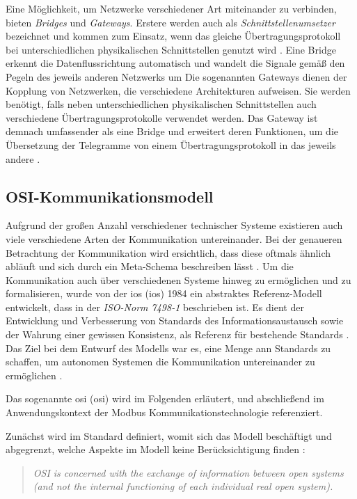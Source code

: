 Eine Möglichkeit, um Netzwerke verschiedener Art miteinander zu verbinden, bieten \textit{Bridges} und \textit{Gateways}. Erstere werden auch als \textit{Schnittstellenumsetzer} bezeichnet und kommen zum Einsatz, wenn das gleiche Übertragungsprotokoll bei unterschiedlichen physikalischen Schnittstellen genutzt wird \cite[S.~80f.]{schn06}. Eine Bridge erkennt die Datenflussrichtung automatisch und wandelt die Signale gemäß den Pegeln des jeweils anderen Netzwerks um \cite[S.~21]{sch08}
Die sogenannten Gateways dienen der Kopplung von Netzwerken, die verschiedene Architekturen aufweisen. Sie werden benötigt, falls neben unterschiedlichen physikalischen Schnittstellen auch verschiedene Übertragungsprotokolle verwendet werden. Das Gateway ist demnach umfassender als eine Bridge und erweitert deren Funktionen, um die Übersetzung der Telegramme von einem Übertragungsprotokoll in das jeweils andere \cite[S.~84f.]{schn06}.


\subsection{OSI-Kommunikationsmodell}

Aufgrund der großen Anzahl verschiedener technischer Systeme existieren auch viele verschiedene Arten der Kommunikation untereinander. Bei der genaueren Betrachtung der Kommunikation wird ersichtlich, dass diese oftmals ähnlich abläuft und sich durch ein Meta-Schema beschreiben lässt \cite[S.~8]{schn06}. Um die Kommunikation auch über verschiedenen Systeme hinweg zu ermöglichen und zu formalisieren, wurde von der \acrlong{ios} (\acrshort{ios}) 1984 ein abstraktes Referenz-Modell entwickelt, dass in der \textit{ISO-Norm 7498-1} beschrieben ist. Es dient der Entwicklung und Verbesserung von Standards des Informationsaustausch sowie der Wahrung einer gewissen Konsistenz, als Referenz für bestehende Standards \cite[S.~1]{osi96}. Das Ziel bei dem Entwurf des Modells war es, eine Menge ann Standards zu schaffen, um autonomen Systemen die Kommunikation untereinander zu ermöglichen \cite[S.~4]{osi96}.

Das sogenannte \acrlong{osi} (\acrshort{osi}) wird im Folgenden erläutert, und abschließend im Anwendungskontext der Modbus Kommunikationstechnologie referenziert.

Zunächst wird im Standard definiert, womit sich das Modell beschäftigt und abgegrenzt, welche Aspekte im Modell keine Berücksichtigung finden \cite[S.~3]{osi96}:
\begin{quote}
\textit{\Gun OSI is concerned with the exchange of information between open systems (and not the internal functioning of each individual real open system).\Gob}
\end{quote}

